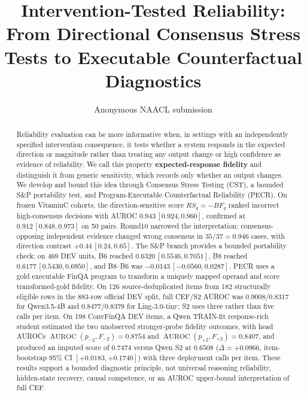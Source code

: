 \documentclass[11pt]{article}
\title{Intervention-Tested Reliability: From Directional Consensus Stress Tests to Executable Counterfactual Diagnostics}
\author{Anonymous NAACL submission}
\begin{document}
\maketitle

\begin{abstract}
Reliability evaluation can be more informative when, in settings with an independently specified intervention consequence, it tests whether a system responds in the expected direction or magnitude rather than treating any output change or high confidence as evidence of reliability. We call this property \textbf{expected-response fidelity} and distinguish it from generic sensitivity, which records only whether an output changes. We develop and bound this idea through Consensus Stress Testing (CST), a bounded S\&P portability test, and Program-Executable Counterfactual Reliability (PECR). On frozen VitaminC cohorts, the direction-sensitive score \(RS_q=-BF_q\) ranked incorrect high-consensus decisions with AUROC \(0.943\,[0.924,0.960]\), confirmed at \(0.912\,[0.848,0.973]\) on 50 pairs. Round10 narrowed the interpretation: consensus-opposing independent evidence changed wrong consensus in \(35/37=0.946\) cases, with direction contrast \(+0.44\,[0.24,0.65]\). The S\&P branch provides a bounded portability check: on 469 DEV units, B6 reached \(0.6320\,[0.5546,0.7051]\), B8 reached \(0.6177\,[0.5430,0.6950]\), and B8--B6 was \(-0.0143\,[-0.0560,0.0287]\). PECR uses a gold executable FinQA program to transform a uniquely mapped operand and score transformed-gold fidelity. On 126 source-deduplicated items from 182 structurally eligible rows in the 883-row official DEV split, full CEF/S2 AUROC was \(0.9008/0.8317\) for Qwen3.5-4B and \(0.8477/0.8379\) for Ling-3.0-tiny; S2 uses three rather than five calls per item. On 198 ConvFinQA DEV items, a Qwen TRAIN-fit response-rich student estimated the two unobserved stronger-probe fidelity outcomes, with head AUROCs \(\operatorname{AUROC}(p_{-2},F_{-2})=0.8754\) and \(\operatorname{AUROC}(p_{+2},F_{+2})=0.8407\), and produced an imputed score of \(0.7474\) versus Qwen S2 at \(0.6508\) (\(\Delta=+0.0966\), item-bootstrap 95\% CI \([+0.0183,+0.1740]\)) with three deployment calls per item. These results support a bounded diagnostic principle, not universal reasoning reliability, hidden-state recovery, causal competence, or an AUROC upper-bound interpretation of full CEF.
\end{abstract}

\end{document}
